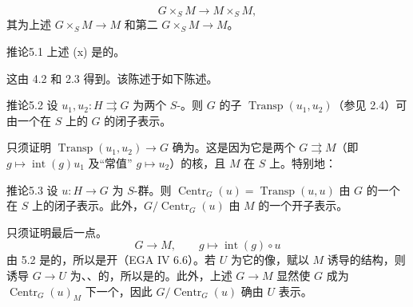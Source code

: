 \[\tag{x}G\times_S M\longrightarrow M\times_S M,\]
其为上述 $G\times_S M\to M$ 和第二 $G\times_S M\to M$。
\begin{SGAresult}{推论}{5.1}
上述 (x) 是的。
\end{SGAresult}
这由 4.2 和 2.3 得到。该陈述于如下陈述。
\begin{SGAresult}{推论}{5.2}
设 $u_1,u_2:H\rightrightarrows G$ 为两个 $S$-。则 $G$ 的子 $\operatorname{Transp}(u_1,u_2)$（参见 2.4）可由一个在 $S$ 上的 $G$ 的闭子表示。
\end{SGAresult}
只须证明 $\operatorname{Transp}(u_1,u_2)\to G$ 确为。这是因为它是两个 $G\rightrightarrows M$（即 $g\mapsto\operatorname{int}(g)u_1$ 及“常值” $g\mapsto u_2$）的核，且 $M$ 在 $S$ 上。特别地：
\begin{SGAresult}{推论}{5.3}
设 $u:H\to G$ 为 $S$-群。则 $\operatorname{Centr}_G(u)=\operatorname{Transp}(u,u)$ 由 $G$ 的一个在 $S$ 上的闭子表示。此外，$G/\operatorname{Centr}_G(u)$ 由 $M$ 的一个开子表示。
\end{SGAresult}
只须证明最后一点。
\[G\longrightarrow M,\qquad g\longmapsto\operatorname{int}(g)\circ u\]
由 5.2 是的，所以是开（EGA IV 6.6）。若 $U$ 为它的像，赋以 $M$ 诱导的结构，则诱导 $G\to U$ 为、、的，所以是的。此外，上述 $G\to M$ 显然使 $G$ 成为 $\operatorname{Centr}_G(u)_M$ 下一个，因此 $G/\operatorname{Centr}_G(u)$ 确由 $U$ 表示。
